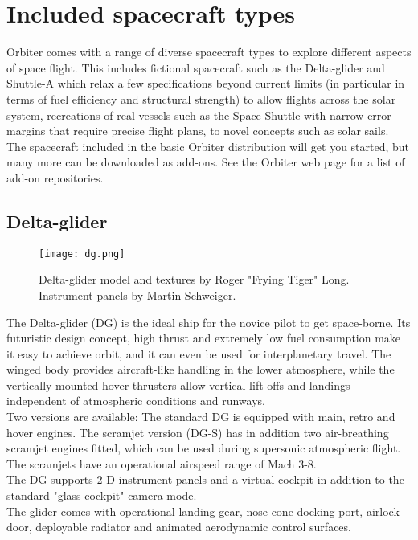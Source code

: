 \documentclass[Orbiter User Manual.tex]{subfiles}
\begin{document}
\section{Included spacecraft types}
Orbiter comes with a range of diverse spacecraft types to explore different aspects of space flight. This includes fictional spacecraft such as the Delta-glider and Shuttle-A which relax a few specifications beyond current limits (in particular in terms of fuel efficiency and structural strength) to allow flights across the solar system, recreations of real vessels such as the Space Shuttle with narrow error margins that require precise flight plans, to novel concepts such as solar sails.\\
The spacecraft included in the basic Orbiter distribution will get you started, but many more can be downloaded as add-ons. See the Orbiter web page for a list of add-on repositories.


\subsection{Delta-glider}
\label{ssec:delta_glider}

\begin{figure}[H]
  \centering
  \texttt{[image: dg.png]}
  \caption{Delta-glider model and textures by Roger "Frying Tiger" Long. Instrument panels by Martin Schweiger.}
\end{figure}

\noindent
The Delta-glider (DG) is the ideal ship for the novice pilot to get space-borne. Its futuristic design concept, high thrust and extremely low fuel consumption make it easy to achieve orbit, and it can even be used for interplanetary travel. The winged body provides aircraft-like handling in the lower atmosphere, while the vertically mounted hover thrusters allow vertical lift-offs and landings independent of atmospheric conditions and runways.\\
Two versions are available: The standard DG is equipped with main, retro and hover engines. The scramjet version (DG-S) has in addition two air-breathing scramjet engines fitted, which can be used during supersonic atmospheric flight. The scramjets have an operational airspeed range of Mach 3-8.\\
The DG supports 2-D instrument panels and a virtual cockpit in addition to the standard "glass cockpit" camera mode.\\
The glider comes with operational landing gear, nose cone docking port, airlock door, deployable radiator and animated aerodynamic control surfaces.
\end{document}
